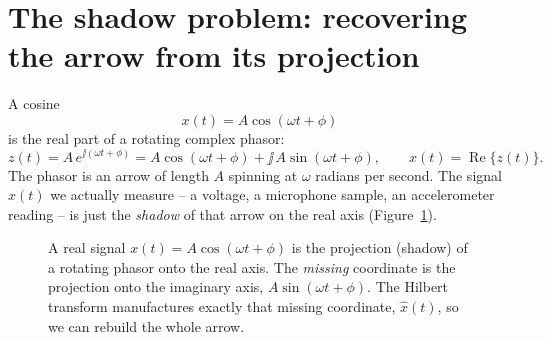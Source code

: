 \section{The shadow problem: recovering the arrow from its projection}
\label{ch25:shadow}

A cosine
\begin{equation}
\label{ch25:cos-shadow}
x(t) = A\cos(\omega t + \phi)
\end{equation}
is the real part of a rotating complex phasor:
\begin{equation}
\label{ch25:phasor}
z(t) = A\, e^{\jj(\omega t + \phi)}
     = A\cos(\omega t+\phi) + \jj\,A\sin(\omega t+\phi),
\qquad x(t) = \operatorname{Re}\{z(t)\}.
\end{equation}
The phasor is an arrow of length $A$ spinning at $\omega$ radians per second. The signal
$x(t)$ we actually measure -- a voltage, a microphone sample, an accelerometer reading --
is just the \emph{shadow} of that arrow on the real axis (Figure~\ref{ch25:fig-phasor}).

\begin{figure}[H]
\centering
{}
\caption{A real signal $x(t)=A\cos(\omega t+\phi)$ is the projection (shadow) of a
rotating phasor onto the real axis. The \emph{missing} coordinate is the projection onto
the imaginary axis, $A\sin(\omega t+\phi)$. The Hilbert transform manufactures exactly
that missing coordinate, $\hat{x}(t)$, so we can rebuild the whole arrow.}
\label{ch25:fig-phasor}
\end{figure}

